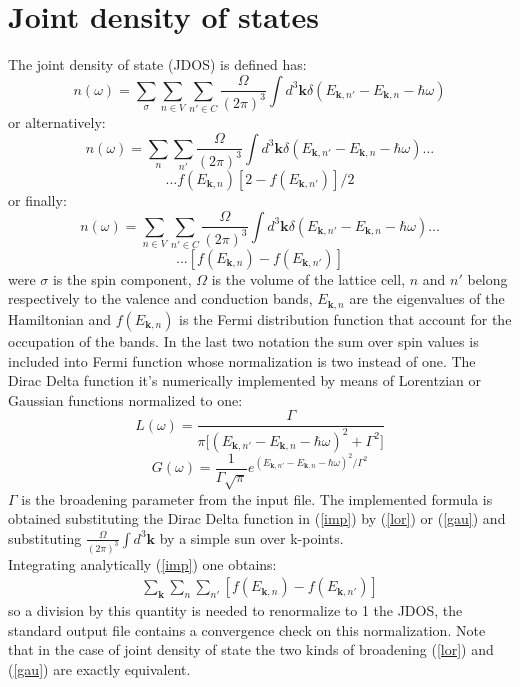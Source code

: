 \documentclass[twocolumn]{article}
\begin{document}
\section{Joint density of states}
The joint density of state (JDOS) is defined has:
\begin{displaymath}
n(\omega)=\sum_{\sigma}\sum_{n\in V}\sum_{n'\in C}\frac{\Omega}{(2\pi)^3}\int d^3\textbf{k}\delta(E_{\textbf{k},n'}-E_{\textbf{k},n}
-\hbar\omega)
\end{displaymath}
or alternatively:
\begin{equation}
n(\omega)=\sum_{n}\sum_{n'}\frac{\Omega}{(2\pi)^3}\int d^3\textbf{k}\delta(E_{\textbf{k},n'}-E_{\textbf{k},n}
-\hbar\omega)...
\label{imp2}
\end{equation}
\begin{displaymath}
...f(E_{\textbf{k},n})[2-f(E_{\textbf{k},n'})]/2
\end{displaymath}
or finally:
\begin{equation}
n(\omega)=\sum_{n\in V}\sum_{n'\in C}\frac{\Omega}{(2\pi)^3}\int d^3\textbf{k}\delta(E_{\textbf{k},n'}-E_{\textbf{k},n}
-\hbar\omega)...
\label{imp}
\end{equation}
\begin{displaymath}
...[f(E_{\textbf{k},n})-f(E_{\textbf{k},n'})]
\end{displaymath}
were $\sigma$ is the spin component, $\Omega$ is the volume of the lattice cell, $n$ and $n'$ belong respectively to the
valence and conduction bands,
$E_{\textbf{k},n}$ are the eigenvalues of the Hamiltonian and $f(E_{\textbf{k},n})$ is the Fermi distribution function
that account for the occupation of the bands. In the last two notation the sum over spin values is included into
Fermi function whose normalization is two instead of one.
The Dirac Delta function it's numerically implemented by means of Lorentzian
or Gaussian functions normalized to one:
\begin{equation}
L(\omega)=\frac{\Gamma}{\pi\big[(E_{\textbf{k},n'}-E_{\textbf{k},n}-\hbar\omega)^2+\Gamma^2\big]}
\label{lor}
\end{equation}
\begin{equation}
G(\omega)=\frac{1}{\Gamma\sqrt{\pi}}e^{(E_{\textbf{k},n'}-E_{\textbf{k},n}-\hbar\omega)^2/\Gamma^2}
\label{gau}
\end{equation}
$\Gamma$ is the broadening parameter from the input file. The implemented formula is obtained substituting the
Dirac Delta function in (\ref{imp}) by (\ref{lor}) or (\ref{gau}) and substituting $\frac{\Omega}{(2\pi)^3}\int
d^3\textbf{k}$ by a simple sun over k-points.\\
Integrating analytically (\ref{imp}) one obtains:
\begin{eqnarray}
\sum_{\textbf{k}}\sum_{n}\sum_{n'}[f(E_{\textbf{k},n})-f(E_{\textbf{k},n'})]
\end{eqnarray}
so a division by this quantity is needed to renormalize to 1 the JDOS, the standard output file
contains a convergence check on this normalization. Note that in the case of
joint density of state the two kinds of broadening (\ref{lor}) and (\ref{gau}) are exactly equivalent.
\end{document}
